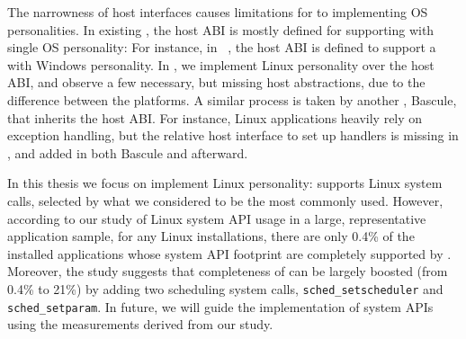 The narrowness of host interfaces causes limitations for \liboses{} to implementing OS personalities.
In existing \liboses{},
the host ABI is mostly defined for supporting \liboses{} with single OS personality:
For instance, in \drawbridge{}~\citep{porter11drawbridge}, the host ABI
is defined to support a \libos{} with Windows personality.
In \graphene{}, we implement Linux personality over the \drawbridge{} host ABI,
and observe a few necessary, but missing host abstractions,
due to the difference between the platforms.
A similar process is taken by another \libos{}, Bascule, that inherits the \drawbridge{} host ABI.
For instance, Linux applications heavily rely on exception handling,
but the relative host interface to set up handlers
is missing in \drawbridge{}, and added in both Bascule and \graphene{} afterward.

In this thesis we focus on implement Linux personality:
\graphene{} supports \syscalls{} Linux system calls,
selected by what we considered to be the most commonly used.
However, according to our study of Linux system API usage in a large, representative application sample,
for any Linux installations,
there are only 0.4\% of the installed applications whose system API footprint
are completely supported by \graphene{}.
Moreover, the study suggests that completeness of \graphene{} can be largely boosted (from 0.4\% to 21\%)
by adding two scheduling system calls,
{\tt sched\_setscheduler} and {\tt sched\_setparam}.
In future, we will guide the implementation of system APIs
using the measurements derived from our study.


